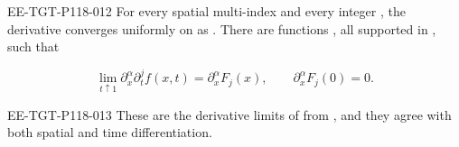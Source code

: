 \begin{lemma}\label{lem:10.2}
\begin{EESegment}{EE-TGT-P118-012}
For every spatial multi-index  and every integer
, the derivative
 converges uniformly on
 as . There are functions
, all supported in
, such that
\end{EESegment}
\begin{equation}
\lim_{t\uparrow1}\partial_x^\alpha\partial_t^jf(x,t)=\partial_x^\alpha F_j(x),
\qquad \partial_x^\alpha F_j(0)=0.
\tag{10.6}\label{eq:10.6}
\end{equation}
\begin{EESegment}{EE-TGT-P118-013}
These are the derivative limits of  from
, and they agree with both spatial and time differentiation.
\end{EESegment}
\end{lemma}
%
